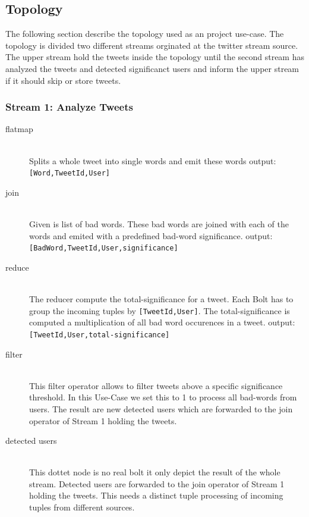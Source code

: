 \subsection{Topology}

The following section describe the topology used as an project use-case. The topology is divided two different streams orginated at the twitter stream source. The upper stream hold the tweets inside the topology until the second stream has analyzed the tweets and detected significanct users and inform the upper stream if it should skip or store tweets.

\subsubsection{Stream 1: Analyze Tweets}
\begin{description}
  \item[flatmap] \hfill \\
      Splits a whole tweet into single words and emit these words
      \newline output: \texttt{[Word,TweetId,User]}
  
  \item[join] \hfill \\
      Given is list of bad words. These bad words are joined with each of the words and emited with a predefined bad-word significance.
      \newline output: \texttt{[BadWord,TweetId,User,significance]}
  \item[reduce] \hfill \\
      The reducer compute the total-significance for a tweet. Each Bolt has to group the incoming tuples by \newline \texttt{[TweetId,User]}. The total-significance is computed a multiplication of all bad word occurences in a tweet.
      \newline output: \texttt{[TweetId,User,total-significance]}
      
  \item[filter] \hfill \\
      This filter operator allows to filter tweets above a specific significance threshold. In this Use-Case we set this to 1 to process all bad-words from users. The result are new detected users which are forwarded to the join operator of Stream 1 holding the tweets.

  \item[detected users] \hfill \\
      This dottet node is no real bolt it only depict the result of the whole stream. Detected users are forwarded to the join operator of Stream 1 holding the tweets. This needs a distinct tuple processing of incoming tuples from different sources. 
      
\end{description}

